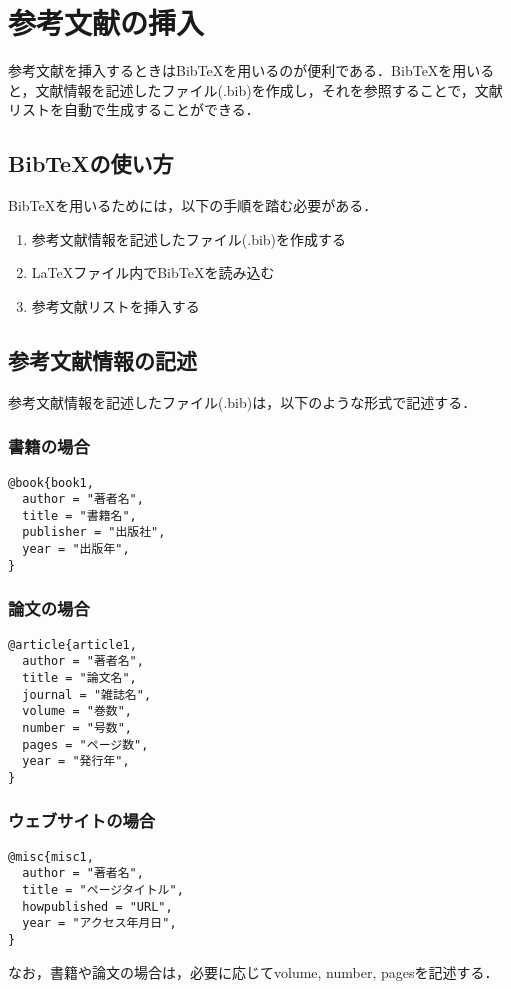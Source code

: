 \section{参考文献の挿入}
参考文献を挿入するときはBibTeXを用いるのが便利である．BibTeXを用いると，文献情報を記述したファイル(.bib)を作成し，それを参照することで，文献リストを自動で生成することができる．
\subsection{BibTeXの使い方}
BibTeXを用いるためには，以下の手順を踏む必要がある．
\begin{enumerate}
  \item 参考文献情報を記述したファイル(.bib)を作成する
  \item \LaTeX ファイル内でBibTeXを読み込む
  \item 参考文献リストを挿入する
\end{enumerate}
\subsection{参考文献情報の記述}
参考文献情報を記述したファイル(.bib)は，以下のような形式で記述する．
\subsubsection{書籍の場合}
\begin{lstlisting}
@book{book1,
  author = "著者名",
  title = "書籍名",
  publisher = "出版社",
  year = "出版年",
}
\end{lstlisting}
\subsubsection{論文の場合}
\begin{lstlisting}
@article{article1,
  author = "著者名",
  title = "論文名",
  journal = "雑誌名",
  volume = "巻数",
  number = "号数",
  pages = "ページ数",
  year = "発行年",
}
\end{lstlisting}

\subsubsection{ウェブサイトの場合}
\begin{lstlisting}
@misc{misc1,
  author = "著者名",
  title = "ページタイトル",
  howpublished = "URL",
  year = "アクセス年月日",
}
\end{lstlisting}
なお，書籍や論文の場合は，必要に応じてvolume, number, pagesを記述する．
